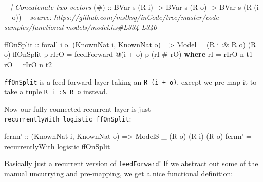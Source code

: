 \documentclass[]{article}
\newenvironment{Shaded}{}{}
\newcommand{\CommentTok}[1]{\textcolor[rgb]{0.38,0.63,0.69}{\textit{#1}}}
\newcommand{\DataTypeTok}[1]{\textcolor[rgb]{0.56,0.13,0.00}{#1}}
\newcommand{\FunctionTok}[1]{\textcolor[rgb]{0.02,0.16,0.49}{#1}}
\newcommand{\KeywordTok}[1]{\textcolor[rgb]{0.00,0.44,0.13}{\textbf{#1}}}
\newcommand{\NormalTok}[1]{#1}
\newcommand{\OtherTok}[1]{\textcolor[rgb]{0.00,0.44,0.13}{#1}}
\begin{document}
\begin{Shaded}
\begin{Highlighting}[]
\CommentTok{-- | Concatenate two vectors}
\OtherTok{(#)          ::} \DataTypeTok{BVar}\NormalTok{ s (}\DataTypeTok{R}\NormalTok{ i) }\OtherTok{->} \DataTypeTok{BVar}\NormalTok{ s (}\DataTypeTok{R}\NormalTok{ o) }\OtherTok{->} \DataTypeTok{BVar}\NormalTok{ s (}\DataTypeTok{R}\NormalTok{ (i }\FunctionTok{+}\NormalTok{ o))}
\CommentTok{-- source: https://github.com/mstksg/inCode/tree/master/code-samples/functional-models/model.hs#L334-L340}

\NormalTok{ffOnSplit}
\OtherTok{    ::}\NormalTok{ forall i o}\FunctionTok{.}\NormalTok{ (}\DataTypeTok{KnownNat}\NormalTok{ i, }\DataTypeTok{KnownNat}\NormalTok{ o)}
    \OtherTok{=>} \DataTypeTok{Model}\NormalTok{ _ (}\DataTypeTok{R}\NormalTok{ i }\FunctionTok{:&} \DataTypeTok{R}\NormalTok{ o) (}\DataTypeTok{R}\NormalTok{ o)}
\NormalTok{ffOnSplit p rIrO }\FunctionTok{=}\NormalTok{ feedForward }\FunctionTok{@}\NormalTok{(i }\FunctionTok{+}\NormalTok{ o) p (rI }\FunctionTok{#}\NormalTok{ rO)}
  \KeywordTok{where}
\NormalTok{    rI }\FunctionTok{=}\NormalTok{ rIrO }\FunctionTok{^^.}\NormalTok{ t1}
\NormalTok{    rO }\FunctionTok{=}\NormalTok{ rIrO }\FunctionTok{^^.}\NormalTok{ t2}
\end{Highlighting}
\end{Shaded}

\texttt{ffOnSplit} is a feed-forward layer taking an \texttt{R\ (i\ +\ o)},
except we pre-map it to take a tuple \texttt{R\ i\ :\&\ R\ o} instead.

Now our fully connected recurrent layer is just
\texttt{recurrentlyWith\ logistic\ ffOnSplit}:

\begin{Shaded}
\begin{Highlighting}[]
\NormalTok{fcrnn'}
\OtherTok{    ::}\NormalTok{ (}\DataTypeTok{KnownNat}\NormalTok{ i, }\DataTypeTok{KnownNat}\NormalTok{ o)}
    \OtherTok{=>} \DataTypeTok{ModelS}\NormalTok{ _ (}\DataTypeTok{R}\NormalTok{ o) (}\DataTypeTok{R}\NormalTok{ i) (}\DataTypeTok{R}\NormalTok{ o)}
\NormalTok{fcrnn' }\FunctionTok{=}\NormalTok{ recurrentlyWith logistic ffOnSplit}
\end{Highlighting}
\end{Shaded}

Basically just a recurrent version of \texttt{feedForward}! If we abstract out
some of the manual uncurrying and pre-mapping, we get a nice functional
definition:
\end{document}
